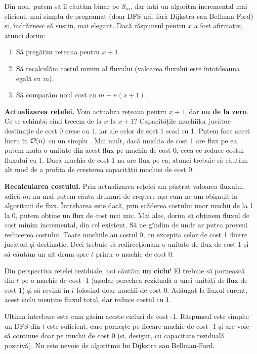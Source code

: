 \documentclass[../main.tex]{subfiles}
\begin{document}
Din nou, putem să îl căutăm binar pe $S_m$, dar iată un algoritm incremental mai eficient, mai simplu de programat (doar DFS-uri, fără Dijkstra sau Bellman-Ford) și, îndrăznesc să susțin, mai elegant. Dacă răspunsul pentru $x$ a fost afirmativ, atunci dorim:

\begin{enumerate}
  \item Să pregătim rețeaua pentru $x + 1$.
  \item Să recalculăm costul minim al fluxului (valoarea fluxului este întotdeauna egală cu $m$).
  \item Să comparăm noul cost cu $m - n(x + 1)$.
\end{enumerate}

\textbf{Actualizarea rețelei.} Vom actualiza rețeaua pentru $x + 1$, dar \textbf{nu de la zero}. Ce se schimbă cînd trecem de la $x$ la $x + 1$? Capacitățile muchiilor jucător-destinație de cost 0 cresc cu 1, iar ale celor de cost 1 scad cu 1. Putem face acest lucru în $\mathcal{O}(n)$ cu un simplu . Mai mult, dacă muchia de cost 1 are flux pe ea, putem muta o unitate din acest flux pe muchia de cost 0, ceea ce reduce costul fluxului cu 1. Dacă muchia de cost 1 nu are flux pe ea, atunci trebuie să căutăm alt mod de a profita de creșterea capacității muchiei de cost 0.

\textbf{Recalcularea costului.} Prin actualizarea rețelei am păstrat valoarea fluxului, adică $m$; nu mai putem căuta drumuri de creștere așa cum ne-am obișnuit la algoritmii de flux. Întrebarea este dacă, prin scăderea costului unor muchii de la 1 la 0, putem obține un flux de cost mai mic. Mai ales, dorim să obținem fluxul de cost minim incremental, din cel existent. Să ne gîndim de unde ar putea proveni reducerea costului. Toate muchiile au costul 0, cu excepția celor de cost 1 dintre jucători și destinație. Deci trebuie să redirecționăm o unitate de flux de cost 1 și să căutăm un alt drum spre $t$ printr-o muchie de cost 0.

Din perspectiva rețelei reziduale, noi căutăm \textbf{un ciclu}! El trebuie să pornească din $t$ pe o muchie de cost -1 (așadar perechea reziduală a unei unități de flux de cost 1) și să revină în $t$ folosind doar muchii de cost 0. Adăugat la fluxul curent, acest ciclu menține fluxul total, dar reduce costul cu 1.

Ultima întrebare este cum găsim aceste cicluri de cost -1. Răspunsul este simplu: un DFS din $t$ este suficient, care pornește pe fiecare muchie de cost -1 și are voie să continue doar pe muchii de cost 0 (și, desigur, cu capacitate reziduală pozitivă). Nu este nevoie de algoritmii lui Dijkstra sau Bellman-Ford.
\end{document}
